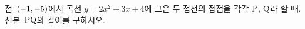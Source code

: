 점~$(-1{,}\mkern3mu\mathopen{}-5)$에서 곡선 $y=2x^2+3x+4$에 그은 두 접선의 접점을 각각 $\mathrm{P}$, $\mathrm{Q}$라 할 때, 선분~$\mathrm{PQ}$의 길이를 구하시오.
